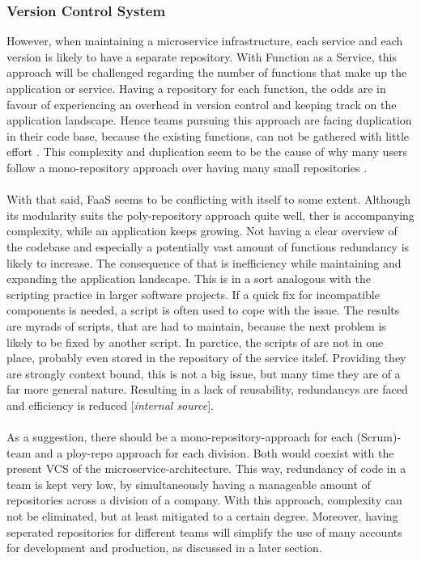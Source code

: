 \documentclass[11pt]{article}
\begin{document}
\subsubsection{Version Control System}
 However, when maintaining a microservice infrastructure, each service and each version is likely to have a separate repository. With Function as a Service, this approach will be challenged regarding the number of functions that make up the application or service. Having a repository for each function, the odds are in favour of experiencing an overhead in version control and keeping track on the application landscape. Hence teams pursuing this approach are facing duplication in their code base, because the existing functions, can not be gathered with little effort \cite{racicot2019quality}. This complexity and duplication seem to be the cause of why many users follow a mono-repository approach over having many small repositories \cite{brousse2019issue}.\\\\ With that said, FaaS seems to be conflicting with itself to some extent. Although its modularity suits the poly-repository approach quite well, ther is accompanying complexity, while an application keeps growing. Not having a clear overview of the codebase and especially a potentially vast amount of functions redundancy is likely to increase. The consequence of that is inefficiency while maintaining and expanding the application landscape. This is in a sort analogous with the scripting practice in larger software projects. If a quick fix for incompatible components is needed, a script is often used to cope with the issue. The results are myrads of scripts, that are had to maintain, because the next problem is likely to be fixed by another script. In parctice, the scripts of are not in one place, probably even stored in the repository of the service itslef. Providing they are strongly context bound, this is not a big issue, but many time they are of a far more general nature. Resulting in a lack of reusability, redundancys are faced and efficiency is reduced [\textit{internal source}].\\\\ As a suggestion, there should be a mono-repository-approach for each (Scrum)-team and a ploy-repo approach for each division. Both would coexist with the present VCS of the microservice-architecture. This way, redundancy of code in a team is kept very low, by simultaneously having a manageable amount of repositories across a division of a company. With this approach, complexity can not be eliminated, but at least mitigated to a certain degree. Moreover, having seperated repositories for different teams will simplify the use of many accounts for development and production, as discussed in a later section.\\\\ 
\end{document}
